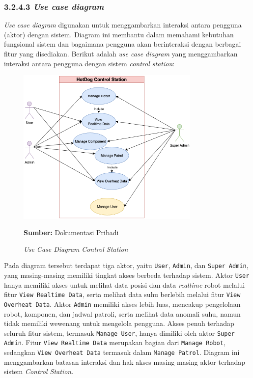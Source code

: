 \subsubsection{3.2.4.3 \emph{Use case diagram}}
\emph{Use case diagram} digunakan untuk menggambarkan interaksi antara pengguna (aktor) dengan sistem. Diagram ini membantu dalam memahami kebutuhan fungsional sistem dan bagaimana pengguna akan berinteraksi dengan berbagai fitur yang disediakan. Berikut adalah \emph{use case diagram} yang menggambarkan interaksi antara pengguna dengan sistem \emph{control station}:

\begin{figure}[H]
  \centering
  \includegraphics[width=0.8\textwidth]{gambar/bab3/usecase.png}
  \caption{\emph{Use Case Diagram} \emph{Control Station}}
  \label{fig:use-case-diagram}
  \footnotesize{\textbf{Sumber:} Dokumentasi Pribadi}
\end{figure}

Pada diagram tersebut terdapat tiga aktor, yaitu \texttt{User}, \texttt{Admin}, dan \texttt{Super Admin}, yang masing-masing memiliki tingkat akses berbeda terhadap sistem. Aktor \texttt{User} hanya memiliki akses untuk melihat data posisi dan data \emph{realtime} robot melalui fitur \texttt{View Realtime Data}, serta melihat data suhu berlebih melalui fitur \texttt{View Overheat Data}. Aktor \texttt{Admin} memiliki akses lebih luas, mencakup pengelolaan robot, komponen, dan jadwal patroli, serta melihat data anomali suhu, namun tidak memiliki wewenang untuk mengelola pengguna. Akses penuh terhadap seluruh fitur sistem, termasuk \texttt{Manage User}, hanya dimiliki oleh aktor \texttt{Super Admin}. Fitur \texttt{View Realtime Data} merupakan bagian dari \texttt{Manage Robot}, sedangkan \texttt{View Overheat Data} termasuk dalam \texttt{Manage Patrol}. Diagram ini menggambarkan batasan interaksi dan hak akses masing-masing aktor terhadap sistem \emph{Control Station}.


